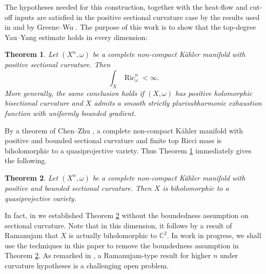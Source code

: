 \documentclass[11pt]{amsart}
\numberwithin{equation}{section}
\newcommand{\Ric}{\operatorname{Ric}}
\theoremstyle{plain}
\newtheorem{theorem}{Theorem}[section]
\theoremstyle{remark}
\begin{document}
The hypotheses needed for this construction, together with the heat-flow and cut-off inputs are satisfied in the positive sectional curvature case by the results used in \cite{DPS,DPS2} and by Greene--Wu \cite{GW}. The purpose of this work is to show that the top-degree Yau--Yang estimate holds in every dimension:


\begin{theorem}\label{thm:main}
Let $(X^n,\omega)$ be a complete non-compact K\"ahler manifold with positive sectional curvature. Then
\[
        \int_X \Ric_{\omega}^n<\infty .
\]
More generally, the same conclusion holds if $(X, \omega)$ has positive holomorphic bisectional curvature and $X$ admits a smooth strictly plurisubharmonic exhaustion function with uniformly bounded gradient.
\end{theorem}

By a theorem of Chen--Zhu \cite{CZ2}, a complete non-compact K\"ahler manifold with positive and bounded sectional curvature and finite top Ricci mass is biholomorphic to a quasiprojective variety. Thus Theorem \ref{thm:main} immediately gives the following.

\begin{theorem}\label{thm:ChenZhucorollary}
Let $(X^n,\omega)$  be a complete non-compact K\"ahler manifold with positive and bounded sectional curvature. Then $X$ is biholomorphic to a quasiprojective variety.
\end{theorem}

In fact, in \cite{DPS2} we established Theorem \ref{thm:ChenZhucorollary} without the boundedness assumption on sectional curvature. Note that in this dimension, it follows by a result of Ramanujam \cite{R} that $X$ is actually biholomorphic to $\mathbb{C}^2$.  In work in progress, we shall use the techniques in this paper to remove the boundedness assumption in Theorem \ref{thm:ChenZhucorollary}. As remarked in \cite{DPS2}, a Ramanujam-type result for higher $n$ under curvature hypotheses is a challenging open problem.
\end{document}
